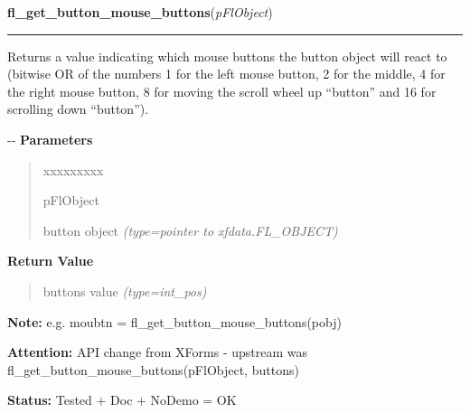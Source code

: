     \vspace{0.5ex}

\hspace{.8\funcindent}\begin{boxedminipage}{\funcwidth}

    \raggedright \textbf{fl\_get\_button\_mouse\_buttons}(\textit{pFlObject})

    \vspace{-1.5ex}

    \rule{\textwidth}{0.5\fboxrule}
\setlength{\parskip}{2ex}

Returns a value indicating which mouse buttons the button object will
react to (bitwise OR of the numbers 1 for the left mouse button, 2 for
the middle, 4 for the right mouse button, 8 for moving the scroll wheel
up ``button'' and 16 for scrolling down ``button'').

-{}-
\setlength{\parskip}{1ex}
      \textbf{Parameters}
      \vspace{-1ex}

      \begin{quote}
        \begin{Ventry}{xxxxxxxxx}

          \item[pFlObject]


button object
            {\it (type=pointer to xfdata.FL\_OBJECT)}

        \end{Ventry}

      \end{quote}

      \textbf{Return Value}
    \vspace{-1ex}

      \begin{quote}

buttons value
      {\it (type=int\_pos)}

      \end{quote}

\textbf{Note:} 
e.g. moubtn = fl\_get\_button\_mouse\_buttons(pobj)


\textbf{Attention:} 
API change from XForms - upstream was
fl\_get\_button\_mouse\_buttons(pFlObject, buttons)


\textbf{Status:} 
Tested + Doc + NoDemo = OK


    \end{boxedminipage}

